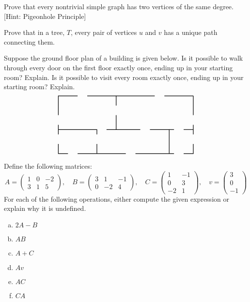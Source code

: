 \documentclass[11pt,letterpaper]{article}
\begin{document}
\newpage





 Prove that every nontrivial simple graph has two vertices of the same degree. [Hint: Pigeonhole Principle] \pspace





\newpage





 Prove that in a tree, $T$, every pair of vertices $u$ and $v$ has a unique path connecting them. \pspace





\newpage





 Suppose the ground floor plan of a building is given below. Is it possible to walk through every door on the first floor exactly once, ending up in your starting room? Explain. Is it possible to visit every room exactly once, ending up in your starting room? Explain. \pspace 
	\[
	\graphSix
	\] \pspace





\newpage





 Define the following matrices:
	\[
	A= \begin{pmatrix} 1 & 0 & -2 \\ 3 & 1 & 5 \end{pmatrix}, \quad
	B= \begin{pmatrix} 3 & 1 & -1 \\	0 & -2 & 4 \end{pmatrix}, \quad
	C= \begin{pmatrix} 1 & -1 \\ 0 & 3 \\ -2 & 1 \end{pmatrix}, \quad
	v= \begin{pmatrix} 3 \\ 0 \\-1\end{pmatrix}
	\]
For each of the following operations, either compute the given expression or explain why it is undefined. 

\begin{enumerate}[(a)]
\item $2A - B$
\item $AB$
\item $A + C$
\item $Av$
\item $AC$
\item $CA$
\end{enumerate} \pspace
\end{document}
